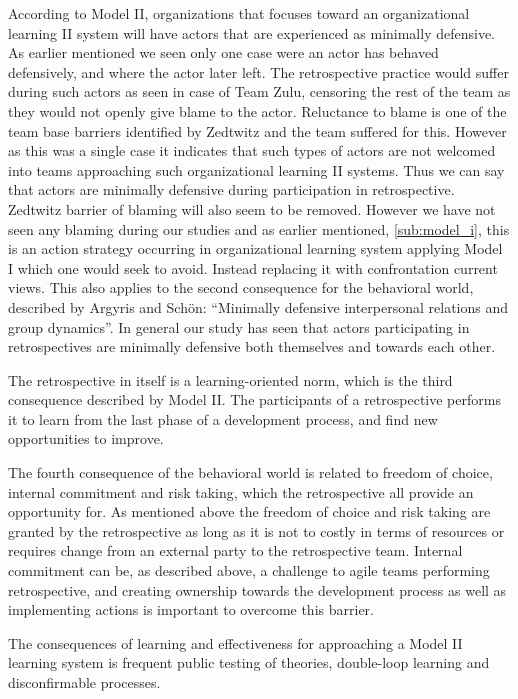 According to Model II, organizations that focuses toward an organizational learning II system will have actors that are experienced as minimally defensive. As earlier mentioned we seen only one case were an actor has behaved defensively, and where the actor later left. The retrospective practice would suffer during such actors as seen in case of Team Zulu, censoring the rest of the team as they would not openly give blame to the actor. Reluctance to blame is one of the team base barriers identified by Zedtwitz\cite{Zedtwitz2002} and the team suffered for this. However as this was a single case it indicates that such types of actors are not welcomed into teams approaching such organizational learning II systems. Thus we can say that actors are minimally defensive during participation in retrospective. Zedtwitz barrier of blaming will also seem to be removed. However we have not seen any blaming during our studies and as earlier mentioned, \autoref{sub:model_i}, this is an action strategy occurring in organizational learning system applying Model I which one would seek to avoid. Instead replacing it with confrontation current views. This also applies to the second consequence for the behavioral world, described by Argyris and Schön: ``Minimally defensive interpersonal relations and group dynamics''. In general our study has seen that actors  participating in retrospectives are minimally defensive both themselves and towards each other. 

The retrospective in itself is a learning-oriented norm, which is the third consequence described by Model II. The participants of a retrospective performs it to learn from the last phase of a development process, and find new opportunities to improve. 

The fourth consequence of the behavioral world is related to freedom of choice, internal commitment and risk taking, which the retrospective all provide an opportunity for. As mentioned above the freedom of choice and risk taking are granted by the retrospective as long as it is not to costly in terms of resources or requires change from an external party to the retrospective team. Internal commitment can be, as described above, a challenge to agile teams performing retrospective, and creating ownership towards the development process as well as implementing actions is important to overcome this barrier.  

The consequences of learning and effectiveness for approaching a Model II learning system is frequent public testing of theories, double-loop learning and disconfirmable processes. 


